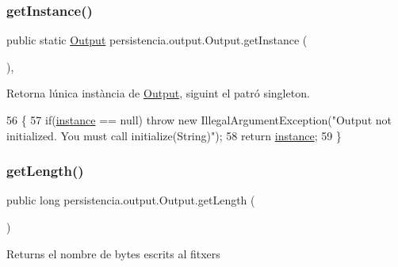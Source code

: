 \subsubsection{\texorpdfstring{get\+Instance()}{getInstance()}}
{\footnotesize\ttfamily public static \hyperlink{classpersistencia_1_1output_1_1Output}{Output} persistencia.\+output.\+Output.\+get\+Instance (\begin{DoxyParamCaption}{ }\end{DoxyParamCaption})\hspace{0.3cm}{\ttfamily [inline]}, {\ttfamily [static]}}



Retorna l\textquotesingle{}única instància de \hyperlink{classpersistencia_1_1output_1_1Output}{Output}, siguint el patró singleton. 


\begin{DoxyCode}
56                                        \{
57         \textcolor{keywordflow}{if}(\hyperlink{classpersistencia_1_1output_1_1Output_aaadf14a03c4f3f585170abdc7524b63d}{instance} == null) \textcolor{keywordflow}{throw} \textcolor{keyword}{new} IllegalArgumentException(\textcolor{stringliteral}{"Output not initialized. You must
       call initialize(String)"});
58         \textcolor{keywordflow}{return} \hyperlink{classpersistencia_1_1output_1_1Output_aaadf14a03c4f3f585170abdc7524b63d}{instance};
59     \}
\end{DoxyCode}
\mbox{\label{classpersistencia_1_1output_1_1Output_a646d510d52039785f485d42e675cdfee}} 
\subsubsection{\texorpdfstring{get\+Length()}{getLength()}}
{\footnotesize\ttfamily public long persistencia.\+output.\+Output.\+get\+Length (\begin{DoxyParamCaption}{ }\end{DoxyParamCaption})\hspace{0.3cm}{\ttfamily [inline]}}

\begin{DoxyReturn}{Returns}
el nombre de bytes escrits al fitxers 
\end{DoxyReturn}

